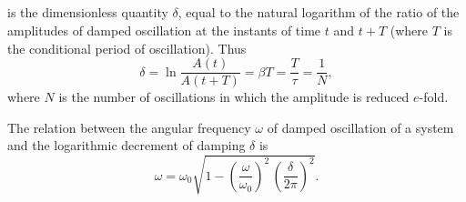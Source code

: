 \subsection{}\label{29.1.4}  is the dimensionless quantity $\delta$, equal to the natural logarithm of the ratio of the amplitudes of damped oscillation at the instants of time $t$ and $t + T$ (where $T$ is the conditional period of oscillation). Thus
\begin{equation*}%
\delta =\ln \frac{A(t)}{A(t+ T)} = \beta T = \frac{T}{\tau} = \frac{1}{N},
\end{equation*}
where $N$ is the number of oscillations in which the amplitude is reduced $e$-fold.

The relation between the angular frequency $\omega$ of damped oscillation of a system and the logarithmic decrement of damping $\delta$ is
\begin{equation*}%
\omega = \omega_{0} \sqrt{1 - \left( \frac{\omega}{\omega_{0}}\right)^{2} \,  \left( \frac{\delta}{2\pi}\right)^{2}}.
\end{equation*}


